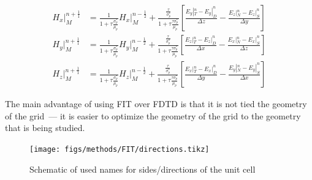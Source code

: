             \begin{align}
                H_x|_M^{n+\frac{1}{1}} &= \frac{1}{1 + \tau\frac{\sigma_p^*}{\mu_p}}H_x|_M^{n-\frac{1}{2}} + \frac{\frac{\tau}{\sigma_p^*}}{1+\tau\frac{\tau\sigma_p^*}{\mu_p}}\left[ \frac{E_y|_T^n - E_y|_D^n}{\Delta z} - \frac{E_z|_N^n - E_z|_S^n}{\Delta y}\right]\\
                H_y|_M^{n+\frac{1}{1}} &= \frac{1}{1 + \tau\frac{\sigma_p^*}{\mu_p}}H_y|_M^{n-\frac{1}{2}} + \frac{\frac{\tau}{\sigma_p^*}}{1+\tau\frac{\tau\sigma_p^*}{\mu_p}}\left[\frac{E_z|_T^n - E_z|_D^n}{\Delta x} - \frac{E_x|_N^n - E_x|_S^n}{\Delta z}\right]\\
                H_z|_M^{n+\frac{1}{1}} &= \frac{1}{1 + \tau\frac{\sigma_p^*}{\mu_p}}H_z|_M^{n-\frac{1}{2}} + \frac{\frac{\tau}{\sigma_p^*}}{1+\tau\frac{\tau\sigma_p^*}{\mu_p}}\left[\frac{E_x|_T^n - E_x|_D^n}{\Delta y} - \frac{E_y|_N^n - E_y|_S^n}{\Delta x}\right]
            \end{align}

            The main advantage of using FIT over FDTD is that it is not tied the geometry of the grid~--- it is easier to optimize the geometry of the grid to the
            geometry that is being studied.


            \begin{figure}
                \centering
                \texttt{[image: figs/methods/FIT/directions.tikz]}
                \caption{Schematic of used names for sides/directions of the unit cell}
                \label{fig:Dir_Int}
            \end{figure}
